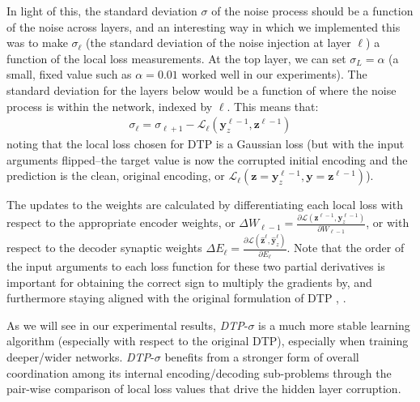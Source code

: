 \documentclass[letterpaper]{article} %
\begin{document}
In light of this, the standard deviation $\sigma$ of the noise process should be a function of the noise across layers, and an interesting way in which we implemented this was to make $\sigma_\ell$ (the standard deviation of the noise injection at layer $\ell$) a function of the local loss measurements. At the top layer, we can set $\sigma_L = \alpha$ (a small, fixed value such as $\alpha = 0.01$ worked well in our experiments). The standard deviation for the layers below would be a function of where the noise process is within the network, indexed by $\ell$. This means that:
\begin{align}
	\sigma_{\ell} = \sigma_{\ell+1} - \mathcal{L}_{\ell}(\mathbf{y}^{\ell-1}_z, \mathbf{z}^{\ell-1})
\end{align}
noting that the local loss chosen for DTP is a Gaussian loss (but with the input arguments flipped--the target value is now the corrupted initial encoding and the prediction is the clean, original encoding, or $\mathcal{L}_{\ell}(\mathbf{z} = \mathbf{y}^{\ell-1}_z, \mathbf{y} = \mathbf{z}^{\ell-1})$).

The updates to the weights are calculated by differentiating each local loss with respect to the appropriate encoder weights, or $\Delta W_{\ell-1} = \frac{\partial \mathcal{L}( \mathbf{z}^{\ell-1}, \mathbf{y}^{\ell-1}_z )}{\partial W_{\ell-1}}$, or with respect to the decoder synaptic weights $\Delta E_{\ell} = \frac{\partial \mathcal{L}( \mathbf{\widehat{z}}^{\ell}, \mathbf{\widehat{y}}^{\ell}_z )}{\partial E_{\ell}}$. Note that the order of the input arguments to each loss function for these two partial derivatives is important for obtaining the correct sign to multiply the gradients by, and furthermore staying aligned with the original formulation of DTP \cite{lee2015difference}, .

As we will see in our experimental results, \emph{DTP}-$\sigma$ is a much more stable learning algorithm (especially with respect to the original DTP), especially when training deeper/wider networks. \emph{DTP}-$\sigma$ benefits from a stronger form of overall coordination among its internal encoding/decoding sub-problems through the pair-wise comparison of local loss values that drive the hidden layer corruption. %
\end{document}
